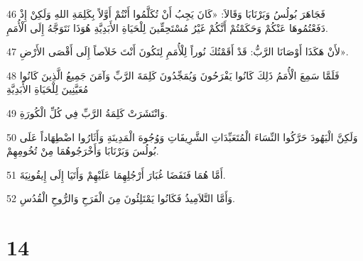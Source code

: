 \par 46 فَجَاهَرَ بُولُسُ وَبَرْنَابَا وَقَالاَ: «كَانَ يَجِبُ أَنْ تُكَلَّمُوا أَنْتُمْ أَوَّلاً بِكَلِمَةِ اللهِ وَلَكِنْ إِذْ دَفَعْتُمُوهَا عَنْكُمْ وَحَكَمْتُمْ أَنَّكُمْ غَيْرُ مُسْتَحِقِّينَ لِلْحَيَاةِ الأَبَدِيَّةِ هُوَذَا نَتَوَجَّهُ إِلَى الْأُمَمِ.
\par 47 لأَنْ هَكَذَا أَوْصَانَا الرَّبُّ: قَدْ أَقَمْتُكَ نُوراً لِلْأُمَمِ لِتَكُونَ أَنْتَ خَلاَصاً إِلَى أَقْصَى الأَرْضِ».
\par 48 فَلَمَّا سَمِعَ الْأُمَمُ ذَلِكَ كَانُوا يَفْرَحُونَ وَيُمَجِّدُونَ كَلِمَةَ الرَّبِّ وَآمَنَ جَمِيعُ الَّذِينَ كَانُوا مُعَيَّنِينَ لِلْحَيَاةِ الأَبَدِيَّةِ
\par 49 وَانْتَشَرَتْ كَلِمَةُ الرَّبِّ فِي كُلِّ الْكُورَةِ.
\par 50 وَلَكِنَّ الْيَهُودَ حَرَّكُوا النِّسَاءَ الْمُتَعَبِّدَاتِ الشَّرِيفَاتِ وَوُجُوهَ الْمَدِينَةِ وَأَثَارُوا اضْطِهَاداً عَلَى بُولُسَ وَبَرْنَابَا وَأَخْرَجُوهُمَا مِنْ تُخُومِهِمْ.
\par 51 أَمَّا هُمَا فَنَفَضَا غُبَارَ أَرْجُلِهِمَا عَلَيْهِمْ وَأَتَيَا إِلَى إِيقُونِيَةَ.
\par 52 وَأَمَّا التَّلاَمِيذُ فَكَانُوا يَمْتَلِئُونَ مِنَ الْفَرَحِ وَالرُّوحِ الْقُدُسِ.

\chapter{14}

